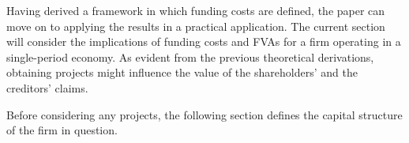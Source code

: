 \documentclass[main.tex]{subfiles}
\begin{document}
    Having derived a framework in which funding costs are defined, 
    the paper can move on to applying the results in a practical application.
    The current section will consider the implications of funding costs and FVAs
    for a firm operating in a single-period economy.
    As evident from the previous theoretical derivations, 
    obtaining projects might influence the value of the shareholders' and the creditors' claims.

    Before considering any projects, 
    the following section defines the capital structure of the firm in question.
\end{document}
